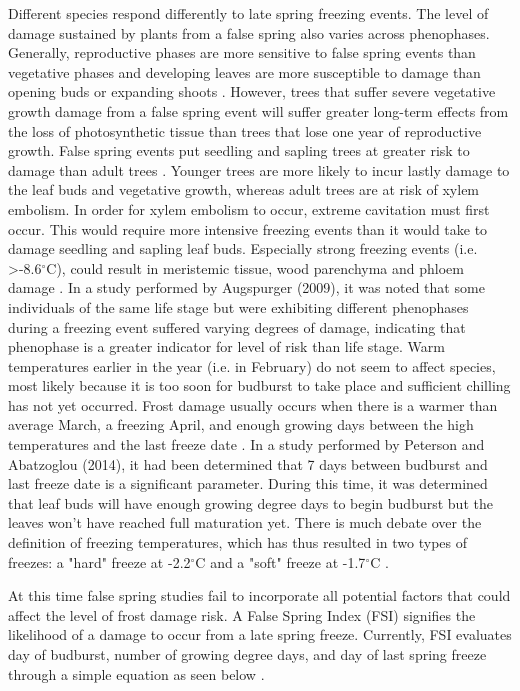 \documentclass{article}\usepackage[]{graphicx}\usepackage[]{color}
\begin{document}
Different species respond differently to late spring freezing events. The level of damage sustained by plants from a false spring also varies across phenophases. Generally, reproductive phases are more sensitive to false spring events than vegetative phases and developing leaves are more susceptible to damage than opening buds or expanding shoots \citep{Lenz2013,Augspurger2009}. However, trees that suffer severe vegetative growth damage from a false spring event will suffer greater long-term effects from the loss of photosynthetic tissue than trees that lose one year of reproductive growth. False spring events put seedling and sapling trees at greater risk to damage than adult trees \citep{Vitasse2014}. Younger trees are more likely to incur lastly damage to the leaf buds and vegetative growth, whereas adult trees are at risk of xylem embolism. In order for xylem embolism to occur, extreme cavitation must first occur. This would require more intensive freezing events than it would take to damage seedling and sapling leaf buds. Especially strong freezing events (i.e. >-8.6$^{\circ}$C), could result in meristemic tissue, wood parenchyma and phloem damage \citep{Lenz2013, Augspurger2011, Sakai1987}. In a study performed by Augspurger (2009), it was noted that some individuals of the same life stage but were exhibiting different phenophases during a freezing event suffered varying degrees of damage, indicating that phenophase is a greater indicator for level of risk than life stage. 
Warm temperatures earlier in the year (i.e. in February) do not seem to affect species, most likely because it is too soon for budburst to take place and sufficient chilling has not yet occurred. Frost damage usually occurs when there is a warmer than average March, a freezing April, and enough growing days between the high temperatures and the last freeze date \citep{Augspurger2013}. 
In a study performed by Peterson and Abatzoglou (2014), it had been determined that 7 days between budburst and last freeze date is a significant parameter. During this time, it was determined that leaf buds will have enough growing degree days to begin budburst but the leaves won't have reached full maturation yet. There is much debate over the definition of freezing temperatures, which has thus resulted in two types of freezes: a "hard" freeze at -2.2$^{\circ}$C and a "soft" freeze at -1.7$^{\circ}$C \citep{Augspurger2013, Kodra2011, Vavrus2006}.

At this time false spring studies fail to incorporate all potential factors that could affect the level of frost damage risk. A False Spring Index (FSI) signifies the likelihood of a damage to occur from a late spring freeze. Currently, FSI evaluates day of budburst, number of growing degree days, and day of last spring freeze through a simple equation as seen below \citep{Marino2011}. 
\end{document}
